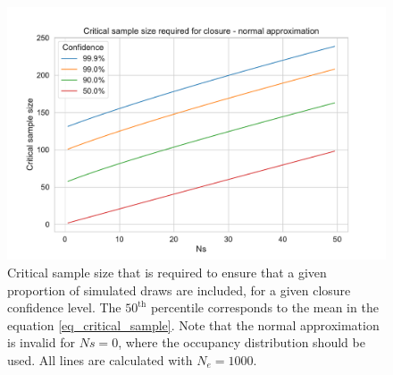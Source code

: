 \documentclass[9pt,twocolumn,twoside,lineno]{gsajnl}
\begin{document}


\begin{figure}
  \centering
  \includegraphics[width=\columnwidth]{fig/critical_normal.pdf}
  \caption{Critical sample size that is required to ensure that a given proportion of simulated
  draws are included, for a given closure confidence level. The
    $50^\text{th}$ percentile corresponds to the mean in the equation \eqref{eq_critical_sample}. Note that the
    normal approximation is invalid for $Ns=0$, where the occupancy distribution should be used. All
    lines are calculated with $N_e=1000$.}
  \label{fig_apx_critical_normal}
\end{figure}
\end{document}
